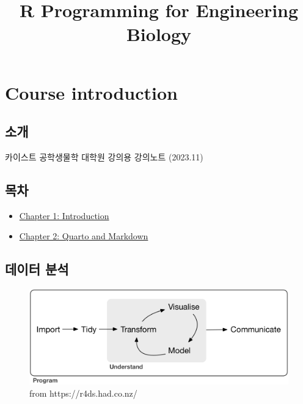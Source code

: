 \documentclass[
  a4paper,
]{book}
\title{R Programming for Engineering Biology}
\author{}
\date{}
\providecommand{\tightlist}{%
  \setlength{\itemsep}{0pt}\setlength{\parskip}{0pt}}\usepackage{longtable,booktabs,array}
\renewcommand*\contentsname{Table of contents}
\newcommand\contentsname{Table of contents}
\begin{document}
\frontmatter
\maketitle
\ifdefined\Shaded\renewenvironment{Shaded}{\begin{tcolorbox}[borderline west={3pt}{0pt}{shadecolor}, interior hidden, sharp corners, enhanced, breakable, boxrule=0pt, frame hidden]}{\end{tcolorbox}}\fi

\renewcommand*\contentsname{Table of contents}
{
\setcounter{tocdepth}{2}
\tableofcontents
}
\mainmatter
{}

\hypertarget{course-introduction}{%
\chapter{Course introduction}\label{course-introduction}}

\hypertarget{uxc18cuxac1c}{%
\section{소개}\label{uxc18cuxac1c}}

카이스트 공학생물학 대학원 강의용 강의노트 (2023.11)

\hypertarget{uxbaa9uxcc28}{%
\section{목차}\label{uxbaa9uxcc28}}

\begin{itemize}
\tightlist
\item
  \protect\hyperlink{introduction}{Chapter 1: Introduction}
\item
  \protect\hyperlink{quarto-and-markdown}{Chapter 2: Quarto and
  Markdown}
\end{itemize}

\hypertarget{uxb370uxc774uxd130-uxbd84uxc11d}{%
\section{데이터 분석}\label{uxb370uxc774uxd130-uxbd84uxc11d}}

\begin{figure}

{\centering \includegraphics[width=5.66667in,height=\textheight]{images/07/data-science.png}

}

\caption{from https://r4ds.had.co.nz/}

\end{figure}
\end{document}

